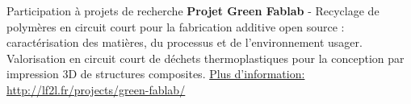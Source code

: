 \begin{rubric}{Participation à projets de recherche}
\entry*[2016-...] \textbf{Projet Green Fablab} - Recyclage de polymères en circuit court pour la fabrication additive open source : caractérisation des matières, du processus et de l’environnement usager. 
Valorisation en circuit court de déchets thermoplastiques pour la conception par impression 3D de structures composites. 
\href{http://lf2l.fr/projects/green-fablab/}{Plus d'information: \underline{http://lf2l.fr/projects/green-fablab/}}


 

\end{rubric}
